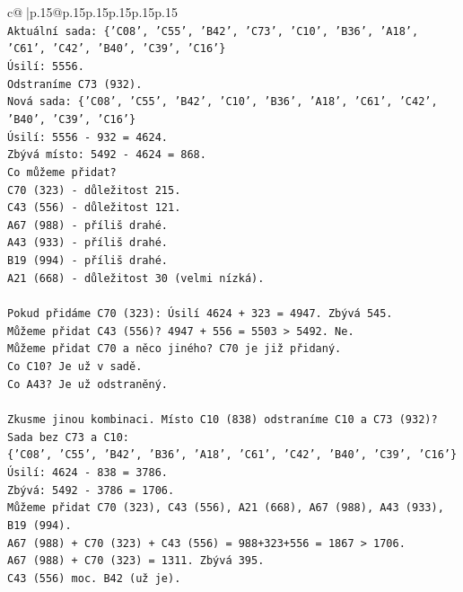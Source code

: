\documentclass{article}
\begin{document}
{\begin{supertabular}{c@{$\;$}|p{.15\linewidth}@{}p{.15\linewidth}p{.15\linewidth}p{.15\linewidth}p{.15\linewidth}p{.15\linewidth}}
{{{\\ 
\texttt{Aktuální sada: \{'C08', 'C55', 'B42', 'C73', 'C10', 'B36', 'A18', 'C61', 'C42', 'B40', 'C39', 'C16'\}} \\
\texttt{Úsilí: 5556.} \\
\texttt{Odstraníme C73 (932).} \\
\texttt{Nová sada: \{'C08', 'C55', 'B42', 'C10', 'B36', 'A18', 'C61', 'C42', 'B40', 'C39', 'C16'\}} \\
\texttt{Úsilí: 5556 {-} 932 = 4624.} \\
\texttt{Zbývá místo: 5492 {-} 4624 = 868.} \\
\texttt{Co můžeme přidat?} \\
\texttt{C70 (323) {-} důležitost 215.} \\
\texttt{C43 (556) {-} důležitost 121.} \\
\texttt{A67 (988) {-} příliš drahé.} \\
\texttt{A43 (933) {-} příliš drahé.} \\
\texttt{B19 (994) {-} příliš drahé.} \\
\texttt{A21 (668) {-} důležitost 30 (velmi nízká).} \\
\\ 
\texttt{Pokud přidáme C70 (323): Úsilí 4624 + 323 = 4947. Zbývá 545.} \\
\texttt{Můžeme přidat C43 (556)? 4947 + 556 = 5503 > 5492. Ne.} \\
\texttt{Můžeme přidat C70 a něco jiného? C70 je již přidaný.} \\
\texttt{Co C10? Je už v sadě.} \\
\texttt{Co A43? Je už odstraněný.} \\
\\ 
\texttt{Zkusme jinou kombinaci. Místo C10 (838) odstraníme C10 a C73 (932)?} \\
\texttt{Sada bez C73 a C10:} \\
\texttt{\{'C08', 'C55', 'B42', 'B36', 'A18', 'C61', 'C42', 'B40', 'C39', 'C16'\}} \\
\texttt{Úsilí: 4624 {-} 838 = 3786.} \\
\texttt{Zbývá: 5492 {-} 3786 = 1706.} \\
\texttt{Můžeme přidat C70 (323), C43 (556), A21 (668), A67 (988), A43 (933), B19 (994).} \\
\texttt{A67 (988) + C70 (323) + C43 (556) = 988+323+556 = 1867 > 1706.} \\
\texttt{A67 (988) + C70 (323) = 1311. Zbývá 395.} \\
\texttt{C43 (556) moc. B42 (už je).} \\
}}}
\end{supertabular}}
\end{document}
